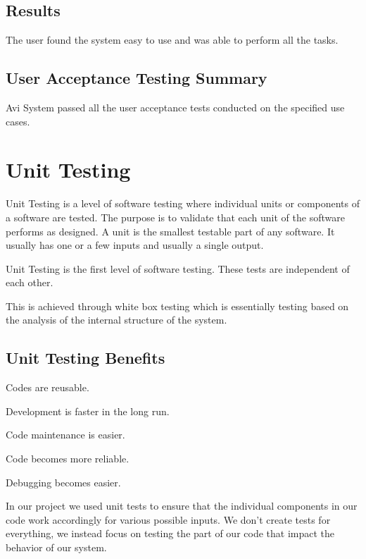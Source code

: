 \documentclass[10pt]{article}
\begin{document}
\subsection{Results}

The user found the system easy to use and was able to perform all the tasks.

\subsection{User Acceptance Testing Summary}

Avi System passed all the user acceptance tests conducted on the specified use cases. 


\section{Unit Testing}

Unit Testing is a level of software testing where individual units or components of a software are tested. The purpose is to validate that each unit of the software performs as designed. A unit is the smallest testable part of any software. It usually has one or a few inputs and usually a single output.

Unit Testing is the first level of software testing. These tests are independent of each other.

This is achieved through white box testing which is essentially testing based on the analysis of the internal structure of the system.

\subsection{Unit Testing Benefits}

\begin{description}[font=$\bullet$~\normalfont\scshape\color{red!50!black}]

\item [] Codes are reusable.
\item [] Development is faster in the long run.
\item [] Code maintenance is easier.
\item [] Code becomes more reliable.
\item [] Debugging becomes easier.

\end{description}

In our project we used unit tests to ensure that the individual components in our code work accordingly for various possible inputs. We don’t create tests for everything, we instead focus on testing the part of our code that impact the behavior of our system.
\end{document}
